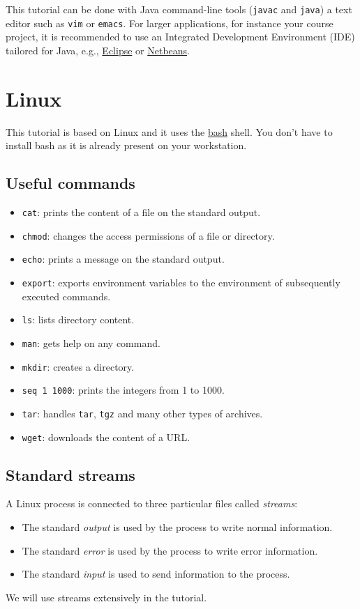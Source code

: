 \documentclass[11pt]{article}
\begin{document}
This tutorial can be done with Java command-line tools
(\texttt{javac} and \texttt{java}) a text editor such as \texttt{vim}
or \texttt{emacs}. For larger applications, for instance your course
project, it is recommended to use an Integrated Development
Environment (IDE) tailored for Java, e.g.,
\href{http://eclipse.org}{Eclipse} or
\href{http://netbeans.org}{Netbeans}.

\section{Linux}
This tutorial is based on Linux and it uses the
\href{https://www.gnu.org/software/bash/}{bash} shell. You don't have
to install bash as it is already present on your workstation.

\subsection{Useful commands}
\begin{itemize}
\item \texttt{cat}: prints the content of a file on the standard output.
\item \texttt{chmod}: changes the access permissions of a file or directory.
\item \texttt{echo}: prints a message on the standard output.
\item \texttt{export}: exports environment variables to the
  environment of subsequently executed commands.
\item \texttt{ls}: lists directory content.
\item \texttt{man}: gets help on any command.
\item \texttt{mkdir}: creates a directory.
\item \texttt{seq 1 1000}: prints the integers from 1 to 1000. 
\item \texttt{tar}: handles 
  \texttt{tar}, \texttt{tgz} and many other types of archives.
\item \texttt{wget}: downloads the content of a URL.
\end{itemize}

\subsection{Standard streams}

A Linux process is connected to three particular files called \emph{streams}:
\begin{itemize}
\item The standard \emph{output} is used by the process to write normal information.
\item The standard \emph{error} is used by the process to write error information.
\item The standard \emph{input} is used to send information to the process.
\end{itemize}
We will use streams extensively in the tutorial.
\end{document}
